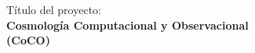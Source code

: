 \section*{}
\begin{center}
{\LARGE T\'itulo del proyecto: \\ {\bf Cosmolog\'ia Computacional y Observacional}\\{\bf (CoCO)}}
\end{center}
